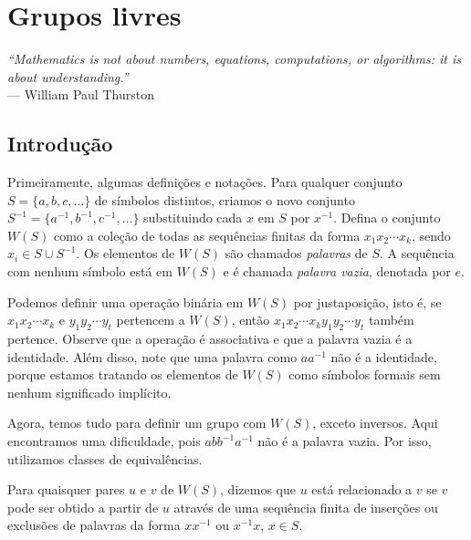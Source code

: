 \chapter[Grupos livres]{Grupos livres}
\label{cap-grupos-livres}
\chaptermark{}
%
\hfill%
\begin{minipage}{10cm}
\begin{flushright}
\rightskip=0.5cm
\textit{``Mathematics is not about numbers, equations, computations, or algorithms: it is about understanding.''}
\\[0.1cm]
\rightskip=0.5cm
--- William Paul Thurston
\end{flushright}
\end{minipage}

\section{Introdução}

    Primeiramente, algumas definições e notações. Para qualquer conjunto $S = \{ a, b, c, \dots \}$ de símbolos distintos, criamos o novo conjunto $S^{-1} = \{ a^{-1}, b^{-1}, c^{-1}, \dots \}$ substituindo cada $x$ em $S$ por $x^{-1}$. Defina o conjunto $W(S)$ como a coleção de todas as sequências finitas da forma $x_1x_2\cdots x_k$, sendo $x_i\in S\cup S^{-1}$. Os elementos de $W(S)$ são chamados \textit{palavras} de $S$. A sequência com nenhum símbolo está em $W(S)$ e é chamada \textit{palavra vazia}, denotada por $e$.
	
	\par\vspace{0.3cm} Podemos definir uma operação binária em $W(S)$ por justaposição, isto é, se $x_1x_2\cdots x_k$ e $y_1y_2\cdots y_t$ pertencem a $W(S)$, então $x_1x_2\cdots x_ky_1y_2\cdots y_t$ também pertence. Observe que a operação é associativa e que a palavra vazia é a identidade. Além disso, note que uma palavra como $aa^{-1}$ não é a identidade, porque estamos tratando os elementos de $W(S)$ como símbolos formais sem nenhum significado implícito.
	
	\par\vspace{0.3cm} Agora, temos tudo para definir um grupo com $W(S)$, exceto inversos. Aqui encontramos uma dificuldade, pois $abb^{-1}a^{-1}$ não é a palavra vazia. Por isso, utilizamos classes de equivalências.
	
	\begin{deff}
		Para quaisquer pares $u$ e $v$ de $W(S)$, dizemos que $u$ está relacionado a $v$ se $v$ pode ser obtido a partir de $u$ através de uma sequência finita de inserções ou exclusões de palavras da forma $xx^{-1}$ ou $x^{-1}x$, $x\in S$.
	\end{deff}
	
